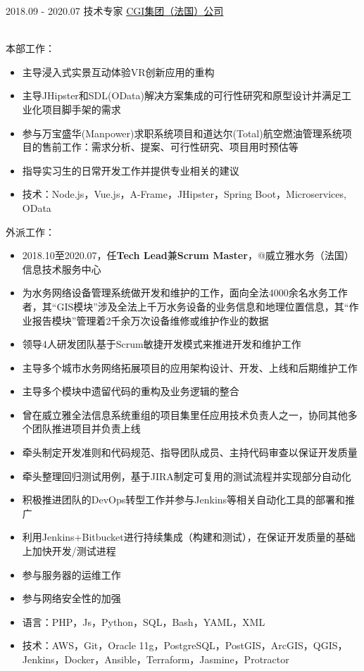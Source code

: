 \documentclass[letterpaper]{twentysecondcv} %
\begin{document}
\begin{twentyfluid}

\twentyitemfluid
    {2018.09 - 2020.07}
    {技术专家}
    {\href{https://www.cgi.fr/fr-fr}{CGI集团（法国）公司}}
    {\\     }
    {
    {
    \\
    本部工作：
    \begin{itemize}
        \item 主导浸入式实景互动体验VR创新应用的重构
        \item 主导JHipster和SDL(OData)解决方案集成的可行性研究和原型设计并满足工业化项目脚手架的需求
        \item 参与万宝盛华(Manpower)求职系统项目和道达尔(Total)航空燃油管理系统项目的售前工作：需求分析、提案、可行性研究、项目用时预估等
        \item 指导实习生的日常开发工作并提供专业相关的建议
        \item 技术：Node.js，Vue.js，A-Frame，JHipster，Spring Boot，Microservices, OData
    \end{itemize}
    外派工作：
    \begin{itemize}
        \item 2018.10至2020.07，任\textbf{Tech Lead}兼\textbf{Scrum Master}，@威立雅水务（法国）信息技术服务中心
        \item 为水务网络设备管理系统做开发和维护的工作，面向全法4000余名水务工作者，其``GIS模块''涉及全法上千万水务设备的业务信息和地理位置信息，其``作业报告模块''管理着2千余万次设备维修或维护作业的数据
        \item 领导4人研发团队基于Scrum敏捷开发模式来推进开发和维护工作
        \item 主导多个城市水务网络拓展项目的应用架构设计、开发、上线和后期维护工作
        \item 主导多个模块中遗留代码的重构及业务逻辑的整合
        \item 曾在威立雅全法信息系统重组的项目集里任应用技术负责人之一，协同其他多个团队推进项目并负责上线
        \item 牵头制定开发准则和代码规范、指导团队成员、主持代码审查以保证开发质量
        \item 牵头整理回归测试用例，基于JIRA制定可复用的测试流程并实现部分自动化
        \item 积极推进团队的DevOps转型工作并参与Jenkins等相关自动化工具的部署和推广
        \item 利用Jenkins+Bitbucket进行持续集成（构建和测试），在保证开发质量的基础上加快开发/测试进程
        \item 参与服务器的运维工作
        \item 参与网络安全性的加强
        \item 语言：PHP，Js，Python，SQL，Bash，YAML，XML
        \item 技术：AWS，Git，Oracle 11g，PostgreSQL，PostGIS，ArcGIS，QGIS，Jenkins，Docker，Ansible，Terraform，Jasmine，Protractor
    \end{itemize}
    }
    }


\end{twentyfluid}
\end{document}
